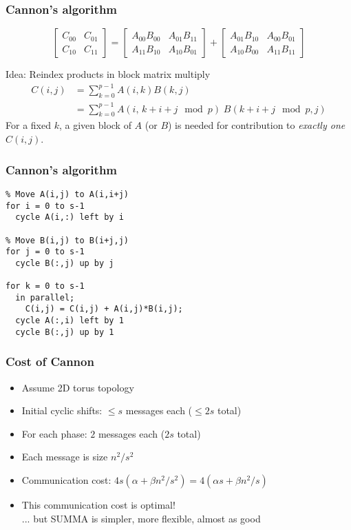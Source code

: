 \documentclass{beamer}
\begin{document}
\begin{frame}
  \frametitle{Cannon's algorithm}

  \[
  \begin{bmatrix}
    C_{00} & C_{01} \\
    C_{10} & C_{11}
  \end{bmatrix} =
  \begin{bmatrix}
    A_{00} B_{00} & A_{01} B_{11} \\
    A_{11} B_{10} & A_{10} B_{01}
  \end{bmatrix} +
  \begin{bmatrix}
    A_{01} B_{10} & A_{00} B_{01} \\
    A_{10} B_{00} & A_{11} B_{11}
  \end{bmatrix}
  \]

  \vspace{5mm}
  Idea: Reindex products in block matrix multiply
  \begin{align*}
    C(i,j) &= \sum_{k = 0}^{p-1} A(i,k) B(k,j) \\
          &= \sum_{k = 0}^{p-1} A(i,\, k+i+j \mod p) \; B(k+i+j \mod p, j)
  \end{align*}
  For a fixed $k$, a given block of $A$ (or $B$) is needed for
  contribution to {\em exactly one} $C(i,j)$.

\end{frame}


\begin{frame}[fragile]
  \frametitle{Cannon's algorithm}

\begin{lstlisting}
% Move A(i,j) to A(i,i+j)
for i = 0 to s-1
  cycle A(i,:) left by i

% Move B(i,j) to B(i+j,j)
for j = 0 to s-1
  cycle B(:,j) up by j

for k = 0 to s-1
  in parallel;
    C(i,j) = C(i,j) + A(i,j)*B(i,j);
  cycle A(:,i) left by 1
  cycle B(:,j) up by 1
\end{lstlisting}

\end{frame}


\begin{frame}
  \frametitle{Cost of Cannon}

  \begin{itemize}
  \item Assume 2D torus topology
  \item Initial cyclic shifts: $\leq s$ messages each ($\leq 2s$ total)
  \item For each phase: $2$ messages each ($2s$ total)
  \item Each message is size $n^2/s^2$
  \item Communication cost:
    $4s(\alpha + \beta n^2/s^2) = 4(\alpha s + \beta n^2/s)$
  \item This communication cost is optimal! \\
    ... but SUMMA is simpler, more flexible, almost as good
  \end{itemize}
\end{frame}
\end{document}
